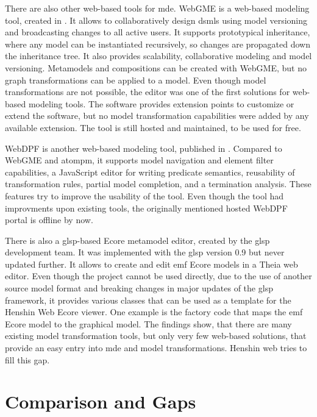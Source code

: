   There are also other web-based tools for \ac{mde}. WebGME \cite{webGME} is a web-based modeling tool, created in \citeyear{webGME}. It allows to collaboratively design \acp{dsml} using model versioning and broadcasting changes to all active users. It supports prototypical inheritance, where any model can be instantiated recursively, so changes are propagated down the inheritance tree. It also provides scalability, collaborative modeling and model versioning. Metamodels and compositions can be created with WebGME, but no graph transformations can be applied to a model. Even though model transformations are not possible, the editor was one of  the first solutions for web-based modeling tools. \cite{webGME} The software provides extension points to customize or extend the software, but no model transformation capabilities were added by any available extension. \cite{webgme-website} The tool is still hosted and maintained, to be used for free. \cite{webgme-website}


  WebDPF \cite{webDPF} is another web-based modeling tool, published in \citeyear{webDPF}. Compared to WebGME and \ac{atompm}, it supports model navigation and element filter capabilities, a JavaScript editor for writing predicate semantics, reusability of transformation rules, partial model completion, and a termination analysis. These features try to improve the usability of the tool. \cite{webDPF} Even though the tool had improvments upon existing tools, the originally mentioned hosted WebDPF portal is offline by now. 


  There is also a \ac{glsp}-based Ecore metamodel editor, created by the \ac{glsp} development team. It was implemented with the \ac{glsp} version 0.9 but never updated further. It allows to create and edit \ac{emf} Ecore models in a Theia web editor. Even though the project cannot be used directly, due to the use of another source model format and breaking changes in major updates of the \ac{glsp} framework, it provides various classes that can be used as a template for the Henshin Web Ecore viewer. One example is the factory code that maps the \ac{emf} Ecore model to the graphical model. \cite{glsp-ecore-repo}
  The findings show, that there are many existing model transformation tools, but only very few web-based solutions, that provide an easy entry into \ac{mde} and model transformations. Henshin web tries to fill this gap.

  \section{Comparison and Gaps}
  \label{subsec:related-comparison}